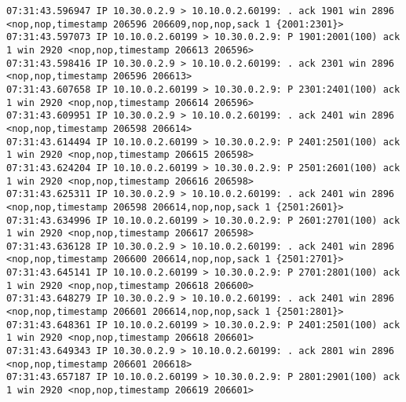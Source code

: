 \documentclass[a4paper,12pt]{article}
\begin{document}
\begin{Verbatim}
07:31:43.596947 IP 10.30.0.2.9 > 10.10.0.2.60199: . ack 1901 win 2896 <nop,nop,timestamp 206596 206609,nop,nop,sack 1 {2001:2301}>
07:31:43.597073 IP 10.10.0.2.60199 > 10.30.0.2.9: P 1901:2001(100) ack 1 win 2920 <nop,nop,timestamp 206613 206596>
07:31:43.598416 IP 10.30.0.2.9 > 10.10.0.2.60199: . ack 2301 win 2896 <nop,nop,timestamp 206596 206613>
07:31:43.607658 IP 10.10.0.2.60199 > 10.30.0.2.9: P 2301:2401(100) ack 1 win 2920 <nop,nop,timestamp 206614 206596>
07:31:43.609951 IP 10.30.0.2.9 > 10.10.0.2.60199: . ack 2401 win 2896 <nop,nop,timestamp 206598 206614>
07:31:43.614494 IP 10.10.0.2.60199 > 10.30.0.2.9: P 2401:2501(100) ack 1 win 2920 <nop,nop,timestamp 206615 206598>
07:31:43.624204 IP 10.10.0.2.60199 > 10.30.0.2.9: P 2501:2601(100) ack 1 win 2920 <nop,nop,timestamp 206616 206598>
07:31:43.625311 IP 10.30.0.2.9 > 10.10.0.2.60199: . ack 2401 win 2896 <nop,nop,timestamp 206598 206614,nop,nop,sack 1 {2501:2601}>
07:31:43.634996 IP 10.10.0.2.60199 > 10.30.0.2.9: P 2601:2701(100) ack 1 win 2920 <nop,nop,timestamp 206617 206598>
07:31:43.636128 IP 10.30.0.2.9 > 10.10.0.2.60199: . ack 2401 win 2896 <nop,nop,timestamp 206600 206614,nop,nop,sack 1 {2501:2701}>
07:31:43.645141 IP 10.10.0.2.60199 > 10.30.0.2.9: P 2701:2801(100) ack 1 win 2920 <nop,nop,timestamp 206618 206600>
07:31:43.648279 IP 10.30.0.2.9 > 10.10.0.2.60199: . ack 2401 win 2896 <nop,nop,timestamp 206601 206614,nop,nop,sack 1 {2501:2801}>
07:31:43.648361 IP 10.10.0.2.60199 > 10.30.0.2.9: P 2401:2501(100) ack 1 win 2920 <nop,nop,timestamp 206618 206601>
07:31:43.649343 IP 10.30.0.2.9 > 10.10.0.2.60199: . ack 2801 win 2896 <nop,nop,timestamp 206601 206618>
07:31:43.657187 IP 10.10.0.2.60199 > 10.30.0.2.9: P 2801:2901(100) ack 1 win 2920 <nop,nop,timestamp 206619 206601>
\end{Verbatim}
\end{document}
